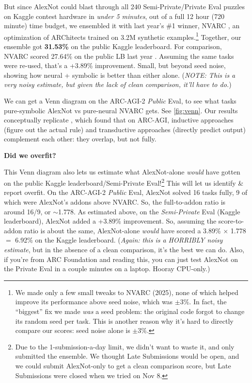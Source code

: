 \documentclass[11pt]{article}
\begin{document}
But since AlexNot could blast through all 240 Semi-Private/Private Eval puzzles on Kaggle contest hardware in \textit{under 5 minutes}, out of a full 12 hour (720 minute) time budget, we ensembled it with last year's \#1 winner, NVARC \citep{nvarc_2025}, an optimization of ARChitects \citep{architects_2024} trained on 3.2M synthetic examples.\footnote{We made only a few small tweaks to NVARC (2025), none of which helped improve its performance above seed noise, which was $\pm3$\%. In fact, the ``biggest'' fix we made \textit{was} a seed problem: the original code forgot to change its random seed per task. This is another reason why it's hard to directly compare our scores: seed noise alone is $\pm3$\%.} Together, our ensemble got \textbf{31.53\%} on the public Kaggle leaderboard. For comparison, NVARC scored 27.64\% on the public LB last year \citep{2025_LB}. Assuming the same tasks were re-used, that's a +3.89\% improvement. Small, but beyond seed noise, showing how neural + symbolic is better than either alone. (\textit{NOTE: This is a very noisy estimate, but given the lack of clean comparison, it'll have to do.})

We can get a Venn diagram on the ARC-AGI-2 \textit{Public} Eval, to see what tasks pure-symbolic AlexNot vs pure-neural NVARC gets. See \autoref{fig:venn}. Our results conceptually replicate \citet{induction_transduction}, which found that on ARC-AGI, inductive approaches (figure out the actual rule) and transductive approaches (directly predict output) complement each other: they overlap, but not fully.

\textbf{Did we overfit?}

This Venn diagram also lets us estimate what AlexNot-alone \textit{would} have gotten on the public Kaggle leaderboard/Semi-Private Eval!\footnote{Due to the 1-submission-a-day limit, we didn't want to waste it, and only submitted the ensemble. We thought Late Submissions would be open, and we could submit AlexNot-only to get a clean comparison score, but Late Submissions were closed when we tried on Nov 8.} This will let us identify \& report overfit. On the ARC-AGI-2 \textit{Public} Eval, AlexNot solved 16 tasks fully, 9 of which were AlexNot's addons above NVARC. So, the full-to-addon ratio is around 16/9, or $\sim$1.778. As estimated above, on the \textit{Semi-Private} Eval (Kaggle leaderboard), AlexNot added a +3.89\% improvement. So, assuming the score-to-addon ratio is about the same, AlexNot-alone \textit{would} have scored a 3.89\% $\times$ 1.778 $=$ 6.92\% on the Kaggle leaderboard. (\textit{Again: this is a HORRIBLY noisy estimate}, but in the absence of a clean comparison, it's the best we can do. Also, if you're from ARC Foundation and reading this, you can just test AlexNot on the Private Eval in a couple minutes on a laptop. Hooray CPU-only.)
\end{document}
